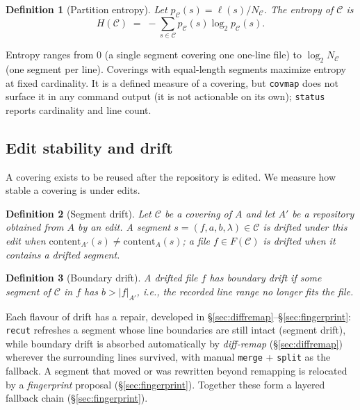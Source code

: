 \documentclass[11pt,a4paper]{article}
\newtheorem{definition}{Definition}[section]
\newcommand{\Cov}{\mathcal{C}}
\begin{document}
\begin{definition}[Partition entropy]\label{def:entropy}
Let $p_\Cov(s) = \ell(s)/N_\Cov$. The \emph{entropy} of $\Cov$ is
\[
  H(\Cov) \;=\; -\sum_{s \in \Cov} p_\Cov(s) \log_2 p_\Cov(s).
\]
\end{definition}

Entropy ranges from $0$ (a single segment covering one one-line file)
to $\log_2 N_\Cov$ (one segment per line). Coverings with equal-length
segments maximize entropy at fixed cardinality. It is a defined measure
of a covering, but \texttt{covmap} does not surface it in any command
output (it is not actionable on its own); \texttt{status} reports
cardinality and line count.

\subsection{Edit stability and drift}

A covering exists to be reused after the repository is edited. We
measure how stable a covering is under edits.

\begin{definition}[Segment drift]\label{def:segment-drift}
Let $\Cov$ be a covering of $A$ and let $A'$ be a repository obtained
from $A$ by an edit. A segment $s = (f, a, b, \lambda) \in \Cov$ is
\emph{drifted} under this edit when
$\mathrm{content}_{A'}(s) \neq \mathrm{content}_A(s)$; a file
$f \in F(\Cov)$ is \emph{drifted} when it contains a drifted segment.
\end{definition}

\begin{definition}[Boundary drift]\label{def:drift-bound}
A drifted file $f$ has \emph{boundary drift} if some segment of
$\Cov$ in $f$ has $b > |f|_{A'}$, i.e., the recorded line range no
longer fits the file.
\end{definition}

Each flavour of drift has a repair, developed in
\S\ref{sec:diffremap}--\S\ref{sec:fingerprint}: \texttt{recut} refreshes a
segment whose line boundaries are still intact (segment drift), while
boundary drift is absorbed automatically by \emph{diff-remap}
(\S\ref{sec:diffremap}) wherever the surrounding lines survived, with
manual \texttt{merge} + \texttt{split} as the fallback. A segment that
moved or was rewritten beyond remapping is relocated by a
\emph{fingerprint} proposal (\S\ref{sec:fingerprint}). Together these
form a layered fallback chain (\S\ref{sec:fingerprint}).
\end{document}

